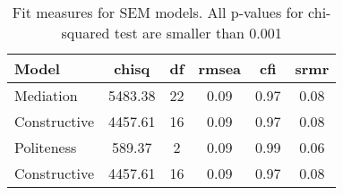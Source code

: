 \begin{table}[H]
\centering
\caption{\label{tab:sem-fit-measures}Fit measures for SEM models. All p-values for chi-squared test are smaller than 0.001}
\centering
\begin{tabular}[t]{lccccc}
\toprule
Model & chisq & df & rmsea & cfi & srmr\\
\midrule
Mediation & 5483.38 & 22 & 0.09 & 0.97 & 0.08\\
\cmidrule{1-6}
Constructive & 4457.61 & 16 & 0.09 & 0.97 & 0.08\\
\cmidrule{1-6}
Politeness & 589.37 & 2 & 0.09 & 0.99 & 0.06\\
\cmidrule{1-6}
Constructive & 4457.61 & 16 & 0.09 & 0.97 & 0.08\\
\bottomrule
\end{tabular}
\end{table}
